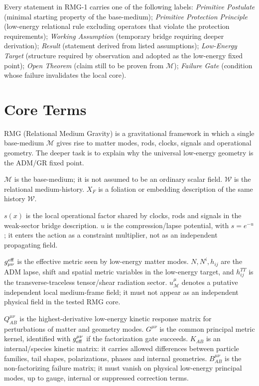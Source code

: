 \documentclass[11pt]{article}
\begin{document}
Every statement in RMG-1 carries one of the following labels:
\textit{Primitive Postulate} (minimal starting property of the base-medium);
\textit{Primitive Protection Principle} (low-energy relational rule excluding
operators that violate the protection requirements);
\textit{Working Assumption} (temporary bridge requiring deeper derivation);
\textit{Result} (statement derived from listed assumptions);
\textit{Low-Energy Target} (structure required by observation and adopted as
the low-energy fixed point);
\textit{Open Theorem} (claim still to be proven from $\mathcal M$);
\textit{Failure Gate} (condition whose failure invalidates the local core).

\section{Core Terms}

RMG (Relational Medium Gravity) is a gravitational framework in which a single
base-medium $\mathcal M$ gives rise to matter modes, rods, clocks, signals and
operational geometry.  The deeper task is to explain why the universal
low-energy geometry is the ADM/GR fixed point.

$\mathcal M$ is the base-medium; it is not assumed to be an ordinary scalar
field.  $\mathcal W$ is the relational medium-history.  $X_F$ is a foliation
or embedding description of the same history $\mathcal W$.

$s(x)$ is the local operational factor shared by clocks, rods and signals in
the weak-sector bridge description.  $u$ is the compression/lapse potential,
with $s=e^{-u}$; it enters the action as a constraint multiplier, not as an
independent propagating field.

$g_{\mu\nu}^{\rm eff}$ is the effective metric seen by low-energy matter
modes.  $N,N^i,h_{ij}$ are the ADM lapse, shift and spatial metric variables
in the low-energy target, and $h_{ij}^{TT}$ is the transverse-traceless
tensor/shear radiation sector.  $u^\mu_{\mathcal M}$ denotes a putative
independent local medium-frame field; it must not appear as an independent
physical field in the tested RMG core.

$Q_{AB}^{\mu\nu}$ is the highest-derivative low-energy kinetic response matrix
for perturbations of matter and geometry modes.  $G^{\mu\nu}$ is the common
principal metric kernel, identified with $g_{\rm eff}^{\mu\nu}$ if the
factorization gate succeeds.  $K_{AB}$ is an internal/species kinetic matrix:
it carries allowed differences between particle families, tail shapes,
polarizations, phases and internal geometries.  $B_{AB}^{\mu\nu}$ is the
non-factorizing failure matrix; it must vanish on physical low-energy
principal modes, up to gauge, internal or suppressed correction terms.
\end{document}
